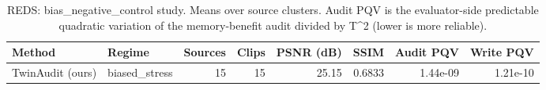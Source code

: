\begin{table}[t]
\centering
\caption{REDS: bias\_negative\_control study. Means over source clusters. Audit PQV is the evaluator-side predictable quadratic variation of the memory-benefit audit divided by T^2 (lower is more reliable).}
\label{tab:bias_negative_control_REDS}
\small
\begin{tabular}{llrrrrrr}
\toprule
Method & Regime & Sources & Clips & PSNR (dB) & SSIM & Audit PQV & Write PQV \\
\midrule
TwinAudit (ours) & biased\_stress & 15 & 15 & 25.15 & 0.6833 & 1.44e-09 & 1.21e-10 \\
\bottomrule
\end{tabular}
\end{table}
